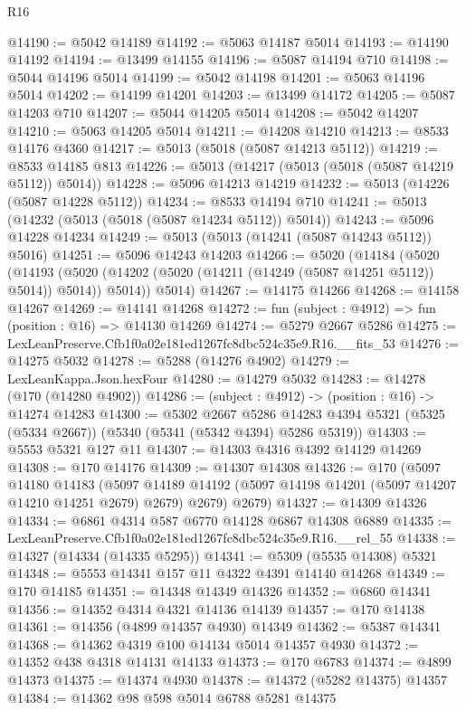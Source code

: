 \begin{lexlean}{R16}
\begin{coremodule}
@14190 := @5042 @14189
@14192 := @5063 @14187 @5014
@14193 := @14190 @14192
@14194 := @13499 @14155
@14196 := @5087 @14194 @710
@14198 := @5044 @14196 @5014
@14199 := @5042 @14198
@14201 := @5063 @14196 @5014
@14202 := @14199 @14201
@14203 := @13499 @14172
@14205 := @5087 @14203 @710
@14207 := @5044 @14205 @5014
@14208 := @5042 @14207
@14210 := @5063 @14205 @5014
@14211 := @14208 @14210
@14213 := @8533 @14176 @4360
@14217 := @5013 (@5018 (@5087 @14213 @5112))
@14219 := @8533 @14185 @813
@14226 := @5013 (@14217 (@5013 (@5018 (@5087 @14219 @5112)) @5014))
@14228 := @5096 @14213 @14219
@14232 := @5013 (@14226 (@5087 @14228 @5112))
@14234 := @8533 @14194 @710
@14241 := @5013 (@14232 (@5013 (@5018 (@5087 @14234 @5112)) @5014))
@14243 := @5096 @14228 @14234
@14249 := @5013 (@5013 (@14241 (@5087 @14243 @5112)) @5016)
@14251 := @5096 @14243 @14203
@14266 := @5020
    (@14184
      (@5020
        (@14193 (@5020 (@14202 (@5020 (@14211 (@14249 (@5087 @14251 @5112)) @5014)) @5014)) @5014))
      @5014)
@14267 := @14175 @14266
@14268 := @14158 @14267
@14269 := @14141 @14268
@14272 := fun (subject : @4912) => fun (position : @16) => @14130 @14269
@14274 := @5279 @2667 @5286
@14275 := LexLeanPreserve.Cfb1f0a02e181ed1267fc8dbc524c35e9.R16.__fits_53
@14276 := @14275 @5032
@14278 := @5288 (@14276 @4902)
@14279 := LexLeanKappa.Json.hexFour
@14280 := @14279 @5032
@14283 := @14278 (@170 (@14280 @4902))
@14286 := (subject : @4912) -> (position : @16) -> @14274 @14283
@14300 := @5302
    @2667
    @5286
    @14283
    @4394
    @5321
    (@5325 (@5334 @2667))
    (@5340 (@5341 (@5342 @4394) @5286 @5319))
@14303 := @5553 @5321 @127 @11
@14307 := @14303 @4316 @4392 @14129 @14269
@14308 := @170 @14176
@14309 := @14307 @14308
@14326 := @170
    (@5097
      @14180
      @14183
      (@5097 @14189 @14192 (@5097 @14198 @14201 (@5097 @14207 @14210 @14251 @2679) @2679) @2679)
      @2679)
@14327 := @14309 @14326
@14334 := @6861 @4314 @587 @6770 @14128 @6867 @14308 @6889
@14335 := LexLeanPreserve.Cfb1f0a02e181ed1267fc8dbc524c35e9.R16.__rel_55
@14338 := @14327 (@14334 (@14335 @5295))
@14341 := @5309 (@5535 @14308) @5321
@14348 := @5553 @14341 @157 @11 @4322 @4391 @14140 @14268
@14349 := @170 @14185
@14351 := @14348 @14349 @14326
@14352 := @6860 @14341
@14356 := @14352 @4314 @4321 @14136 @14139
@14357 := @170 @14138
@14361 := @14356 (@4899 @14357 @4930) @14349
@14362 := @5387 @14341
@14368 := @14362 @4319 @100 @14134 @5014 @14357 @4930
@14372 := @14352 @438 @4318 @14131 @14133
@14373 := @170 @6783
@14374 := @4899 @14373
@14375 := @14374 @4930
@14378 := @14372 (@5282 @14375) @14357
@14384 := @14362 @98 @598 @5014 @6788 @5281 @14375

\end{coremodule}
\end{lexlean}
